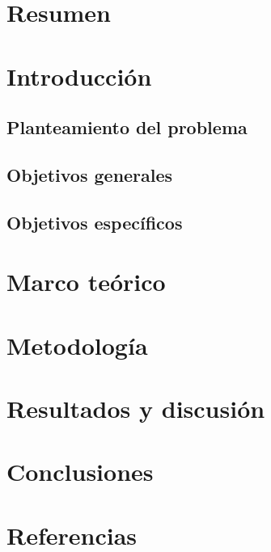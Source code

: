 \documentclass{report}          %
\begin{document}
    \tableofcontents
    
    \chapter{Resumen}

    \chapter{Introducción}
        \section{Planteamiento del problema}

        \section{Objetivos generales}

        \section{Objetivos específicos}


    \chapter{Marco teórico}  
        
        
    \chapter{Metodología}
            
    \chapter{Resultados y discusión}

    \chapter{Conclusiones}
        

    \chapter{Referencias}
\end{document}
